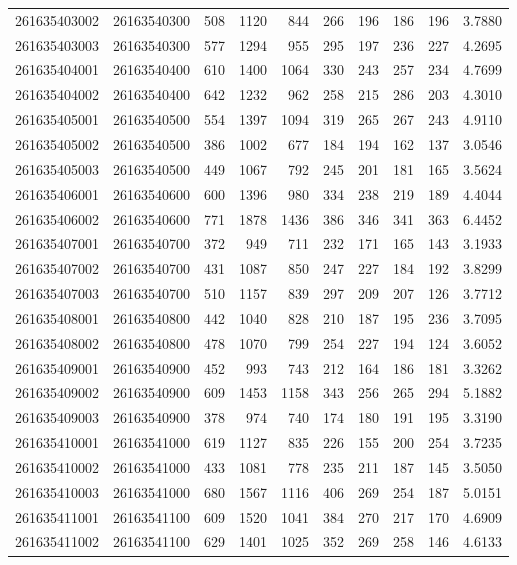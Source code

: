 \documentclass[
  11pt,
]{article}
\begin{document}
\begin{longtable}[t]{llrrrrrrrr}
261635403002 & 26163540300 & 508 & 1120 & 844 & 266 & 196 & 186 & 196 & 3.7880\\
261635403003 & 26163540300 & 577 & 1294 & 955 & 295 & 197 & 236 & 227 & 4.2695\\
261635404001 & 26163540400 & 610 & 1400 & 1064 & 330 & 243 & 257 & 234 & 4.7699\\
261635404002 & 26163540400 & 642 & 1232 & 962 & 258 & 215 & 286 & 203 & 4.3010\\
261635405001 & 26163540500 & 554 & 1397 & 1094 & 319 & 265 & 267 & 243 & 4.9110\\
261635405002 & 26163540500 & 386 & 1002 & 677 & 184 & 194 & 162 & 137 & 3.0546\\
261635405003 & 26163540500 & 449 & 1067 & 792 & 245 & 201 & 181 & 165 & 3.5624\\
261635406001 & 26163540600 & 600 & 1396 & 980 & 334 & 238 & 219 & 189 & 4.4044\\
261635406002 & 26163540600 & 771 & 1878 & 1436 & 386 & 346 & 341 & 363 & 6.4452\\
261635407001 & 26163540700 & 372 & 949 & 711 & 232 & 171 & 165 & 143 & 3.1933\\
261635407002 & 26163540700 & 431 & 1087 & 850 & 247 & 227 & 184 & 192 & 3.8299\\
261635407003 & 26163540700 & 510 & 1157 & 839 & 297 & 209 & 207 & 126 & 3.7712\\
261635408001 & 26163540800 & 442 & 1040 & 828 & 210 & 187 & 195 & 236 & 3.7095\\
261635408002 & 26163540800 & 478 & 1070 & 799 & 254 & 227 & 194 & 124 & 3.6052\\
261635409001 & 26163540900 & 452 & 993 & 743 & 212 & 164 & 186 & 181 & 3.3262\\
261635409002 & 26163540900 & 609 & 1453 & 1158 & 343 & 256 & 265 & 294 & 5.1882\\
261635409003 & 26163540900 & 378 & 974 & 740 & 174 & 180 & 191 & 195 & 3.3190\\
261635410001 & 26163541000 & 619 & 1127 & 835 & 226 & 155 & 200 & 254 & 3.7235\\
261635410002 & 26163541000 & 433 & 1081 & 778 & 235 & 211 & 187 & 145 & 3.5050\\
261635410003 & 26163541000 & 680 & 1567 & 1116 & 406 & 269 & 254 & 187 & 5.0151\\
261635411001 & 26163541100 & 609 & 1520 & 1041 & 384 & 270 & 217 & 170 & 4.6909\\
261635411002 & 26163541100 & 629 & 1401 & 1025 & 352 & 269 & 258 & 146 & 4.6133\\

\end{longtable}
\end{document}
